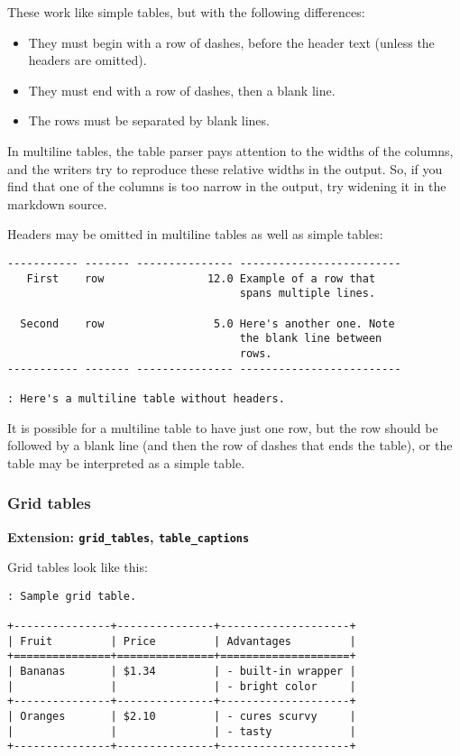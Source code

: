 \documentclass[]{article}
\begin{document}
These work like simple tables, but with the following differences:

\begin{itemize}
\item
  They must begin with a row of dashes, before the header text (unless
  the headers are omitted).
\item
  They must end with a row of dashes, then a blank line.
\item
  The rows must be separated by blank lines.
\end{itemize}

In multiline tables, the table parser pays attention to the widths of
the columns, and the writers try to reproduce these relative widths in
the output. So, if you find that one of the columns is too narrow in the
output, try widening it in the markdown source.

Headers may be omitted in multiline tables as well as simple tables:

\begin{verbatim}
----------- ------- --------------- -------------------------
   First    row                12.0 Example of a row that
                                    spans multiple lines.

  Second    row                 5.0 Here's another one. Note
                                    the blank line between
                                    rows.
----------- ------- --------------- -------------------------

: Here's a multiline table without headers.
\end{verbatim}

It is possible for a multiline table to have just one row, but the row
should be followed by a blank line (and then the row of dashes that ends
the table), or the table may be interpreted as a simple table.

\subsubsection{Grid tables}

\textbf{Extension: \texttt{grid\_tables}, \texttt{table\_captions}}

Grid tables look like this:

\begin{verbatim}
: Sample grid table.

+---------------+---------------+--------------------+
| Fruit         | Price         | Advantages         |
+===============+===============+====================+
| Bananas       | $1.34         | - built-in wrapper |
|               |               | - bright color     |
+---------------+---------------+--------------------+
| Oranges       | $2.10         | - cures scurvy     |
|               |               | - tasty            |
+---------------+---------------+--------------------+
\end{verbatim}
\end{document}
